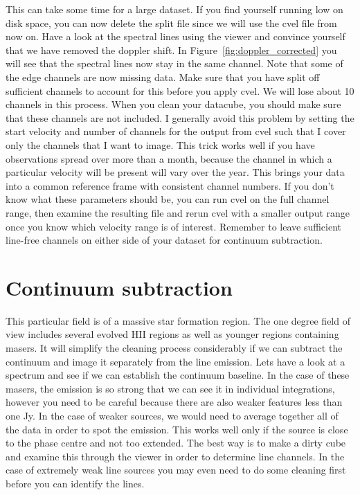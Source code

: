 \documentclass[force,almostfull,justified]{tufte-book}
\begin{document}
This can take some time for a large dataset.  If you find yourself running low on disk space, you can
now delete the split file since we will use the cvel file from now on. Have a look at the spectral
lines using the viewer and convince yourself that we have removed the doppler shift. In
Figure~\ref{fig:doppler_corrected} you will see that the spectral lines now stay in the same channel.
Note that some of the edge channels are now missing data.  Make sure that you have split off
sufficient channels to account for this before you apply cvel.  We will lose about 10 channels in this
process. When you clean your datacube, you should make sure that these channels are not included. I
generally avoid this problem by setting the start velocity and number of channels for the output from
cvel such that I cover only the channels that I want to image.  This trick works well if you have
observations spread over more than a month, because the channel in which a particular velocity will be
present will vary over the year.  This brings your data into a common reference frame with consistent
channel numbers. If you don't know what these parameters should be, you can run cvel on the full
channel range, then examine the resulting file and rerun cvel with a smaller output range once you
know which velocity range is of interest.  Remember to leave sufficient line-free channels on either
side of your dataset for continuum subtraction.


\section{Continuum subtraction}

This particular field is of a massive star formation region.  The one degree field of view includes
several evolved HII regions as well as younger regions containing masers.  It will simplify the
cleaning process considerably if we can subtract the continuum and image it separately from the line
emission.  Lets have a look at a spectrum and see if we can establish the continuum baseline.  In the
case of these masers, the emission is so strong that we can see it in individual integrations, however
you need to be careful because there are also weaker features less than one Jy.  In the case of weaker
sources, we would need to average together all of the data in order to spot the emission. This works
well only if the source is close to the phase centre and not too extended.  The best way is to make a
dirty cube and examine this through the viewer in order to determine line channels. In the case of
extremely weak line sources you may even need to do some cleaning first before you can identify the
lines.
\end{document}
